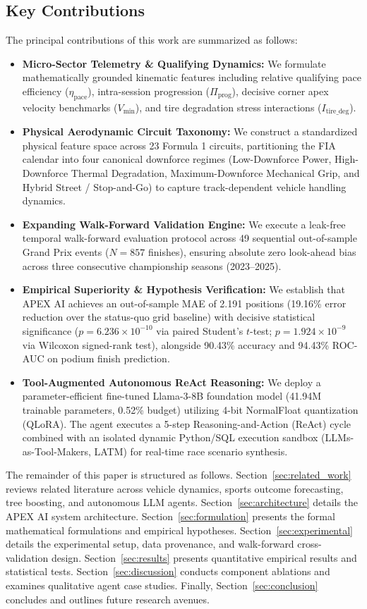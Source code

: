\documentclass[journal]{IEEEtran}
\begin{document}
\subsection{Key Contributions}
The principal contributions of this work are summarized as follows:
\begin{itemize}
    \item \textbf{Micro-Sector Telemetry & Qualifying Dynamics:} We formulate mathematically grounded kinematic features including relative qualifying pace efficiency ($\eta_{\text{pace}}$), intra-session progression ($\Pi_{\text{prog}}$), decisive corner apex velocity benchmarks ($V_{\text{min}}$), and tire degradation stress interactions ($I_{\text{tire\_deg}}$).
    \item \textbf{Physical Aerodynamic Circuit Taxonomy:} We construct a standardized physical feature space across 23 Formula 1 circuits, partitioning the FIA calendar into four canonical downforce regimes (Low-Downforce Power, High-Downforce Thermal Degradation, Maximum-Downforce Mechanical Grip, and Hybrid Street / Stop-and-Go) to capture track-dependent vehicle handling dynamics.
    \item \textbf{Expanding Walk-Forward Validation Engine:} We execute a leak-free temporal walk-forward evaluation protocol across 49 sequential out-of-sample Grand Prix events ($N = 857$ finishes), ensuring absolute zero look-ahead bias across three consecutive championship seasons (2023--2025).
    \item \textbf{Empirical Superiority & Hypothesis Verification:} We establish that APEX AI achieves an out-of-sample MAE of 2.191 positions (19.16\% error reduction over the status-quo grid baseline) with decisive statistical significance ($p = 6.236 \times 10^{-10}$ via paired Student's $t$-test; $p = 1.924 \times 10^{-9}$ via Wilcoxon signed-rank test), alongside 90.43\% accuracy and 94.43\% ROC-AUC on podium finish prediction.
    \item \textbf{Tool-Augmented Autonomous ReAct Reasoning:} We deploy a parameter-efficient fine-tuned Llama-3-8B foundation model (41.94M trainable parameters, 0.52\% budget) utilizing 4-bit NormalFloat quantization (QLoRA). The agent executes a 5-step Reasoning-and-Action (ReAct) cycle combined with an isolated dynamic Python/SQL execution sandbox (LLMs-as-Tool-Makers, LATM) for real-time race scenario synthesis.
\end{itemize}

The remainder of this paper is structured as follows. Section~\ref{sec:related_work} reviews related literature across vehicle dynamics, sports outcome forecasting, tree boosting, and autonomous LLM agents. Section~\ref{sec:architecture} details the APEX AI system architecture. Section~\ref{sec:formulation} presents the formal mathematical formulations and empirical hypotheses. Section~\ref{sec:experimental} details the experimental setup, data provenance, and walk-forward cross-validation design. Section~\ref{sec:results} presents quantitative empirical results and statistical tests. Section~\ref{sec:discussion} conducts component ablations and examines qualitative agent case studies. Finally, Section~\ref{sec:conclusion} concludes and outlines future research avenues.
\end{document}
